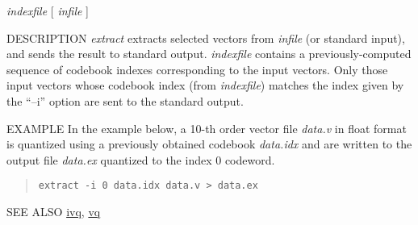 \begin{synopsis}
\item [extract] [ --l $L$ ] [ --i $I$ ]  {\em indexfile}  [ {\em infile} ] 
\end{synopsis}

\begin{qsection}{DESCRIPTION}
{\em extract} extracts selected vectors 
from {\em infile} (or standard input), 
and sends the result to standard output. 
{\em indexfile} contains a previously-computed sequence of 
codebook indexes corresponding to the input vectors.  
Only those input vectors whose codebook index (from {\em indexfile}) 
matches the index given by the ``--i'' option 
are sent to the standard output.
\end{qsection}

\begin{options}
\end{options}

\begin{qsection}{EXAMPLE}
In the example below, a 10-th order vector file {\em data.v}
in float format is quantized using a previously obtained
codebook {\em data.idx} and are written to the output file {\em
  data.ex} quantized to the index 0 codeword.
\begin{quote}
\verb!extract -i 0 data.idx data.v > data.ex!
\end{quote}
\end{qsection}

\begin{qsection}{SEE ALSO}
\hyperlink{ivq}{ivq},
\hyperlink{vq}{vq}
\end{qsection}
